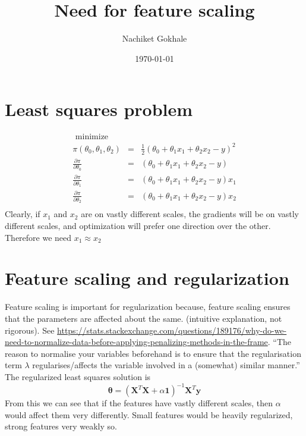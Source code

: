 \documentclass{article}
\newcommand{\beq}{\begin{equation}}
\newcommand{\eeq}{\end{equation}}
\newcommand{\ber}{\begin{eqnarray}}
\newcommand{\eer}{\end{eqnarray}}
\newcommand{\nn}{\nonumber}
\begin{document}
\title{Need for feature scaling}
\author{Nachiket Gokhale}
\date{\today}
\maketitle
\section{Least squares problem}
\ber
\text{ minimize }\nn\\
\pi(\theta_0,\theta_1,\theta_2) &=& \frac{1}{2}(\theta_0 + \theta_1x_1 + \theta_2x_2 - y)^2\\
\frac{\partial\pi}{\partial\theta_0} &=& (\theta_0 + \theta_1x_1 + \theta_2x_2 - y) \nn \\
\frac{\partial\pi}{\partial\theta_1} &=& (\theta_0 + \theta_1x_1 + \theta_2x_2 - y)x_1 \nn \\
\frac{\partial\pi}{\partial\theta_2} &=& (\theta_0 + \theta_1x_1 + \theta_2x_2 - y)x_2 \nn \\
\eer
Clearly, if $x_1$ and $x_2$ are on vastly different scales, the gradients will be on vastly different scales, and optimization will prefer one direction over the other. Therefore we need $x_1\approx x_2$
%
\section{Feature scaling and regularization}
Feature scaling is important for regularization because, feature scaling ensures that the parameters are affected about the same. (intuitive explanation, not rigorous). See \url{https://stats.stackexchange.com/questions/189176/why-do-we-need-to-normalize-data-before-applying-penalizing-methods-in-the-frame}. ``The reason to normalise your variables beforehand is to ensure that the regularisation term $\lambda$ regularises/affects the variable involved in a (somewhat) similar manner.''
%
The regularized least squares solution is 
\beq
\pmb{\theta}=(\pmb{X}^T\pmb{X} + \alpha\pmb{1})^{-1}\pmb{X}^T\pmb{y}
\eeq
From this we can see that if the features have vastly different scales, then $\alpha$ would affect them very differently. Small features would be heavily regularized, strong features very weakly so.
\end{document}
